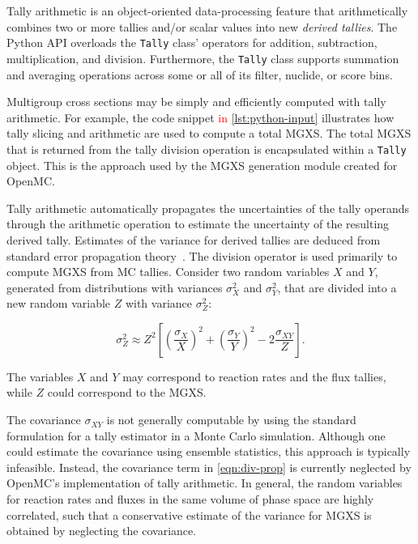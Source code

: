 Tally arithmetic is an object-oriented data-processing feature that arithmetically combines two or more tallies and/or scalar values into new \emph{derived tallies}. The Python API overloads the \texttt{Tally} class' operators for addition, subtraction, multiplication, and division. Furthermore, the \texttt{Tally} class supports summation and averaging operations across some or all of its filter, nuclide, or score bins.

Multigroup cross sections may be simply and efficiently computed with tally arithmetic. For example, the code snippet \textcolor{red}{in \cref{lst:python-input}} illustrates how tally slicing and arithmetic are used to compute a total MGXS. The total MGXS that is returned from the tally division operation is encapsulated within a \texttt{Tally} object. This is the approach used by the MGXS generation module created for OpenMC.



Tally arithmetic automatically propagates the uncertainties of the tally operands through the arithmetic operation to estimate the uncertainty of the resulting derived tally. Estimates of the variance for derived tallies are deduced from standard error propagation theory~\cite{bevington2003data}. The division operator is used primarily to compute MGXS from MC tallies. Consider two random variables $X$ and $Y$, generated from distributions with variances $\sigma_{X}^2$ and $\sigma_{Y}^2$, that are divided into a new random variable $Z$ with variance $\sigma_{Z}^2$:

\begin{equation}
\label{eqn:div-prop}
\sigma_{Z}^{2} \approx Z^{2}\left[\left(\frac{\sigma_{X}}{X}\right)^{2} + \left(\frac{\sigma_{Y}}{Y}\right)^{2} - 2\frac{\sigma_{XY}}{Z}\right].
\end{equation}

\noindent The variables $X$ and $Y$ may correspond to reaction rates and the flux tallies, while $Z$ could correspond to the MGXS.

The covariance $\sigma_{XY}$ is not generally computable by using the standard formulation for a tally estimator in a Monte Carlo simulation. Although one could estimate the covariance using ensemble statistics, this approach is typically infeasible. Instead, the covariance term in \cref{eqn:div-prop} is currently neglected by OpenMC's implementation of tally arithmetic. In general, the random variables for reaction rates and fluxes in the same volume of phase space are highly correlated, such that a conservative estimate of the variance for MGXS is obtained by neglecting the covariance.

